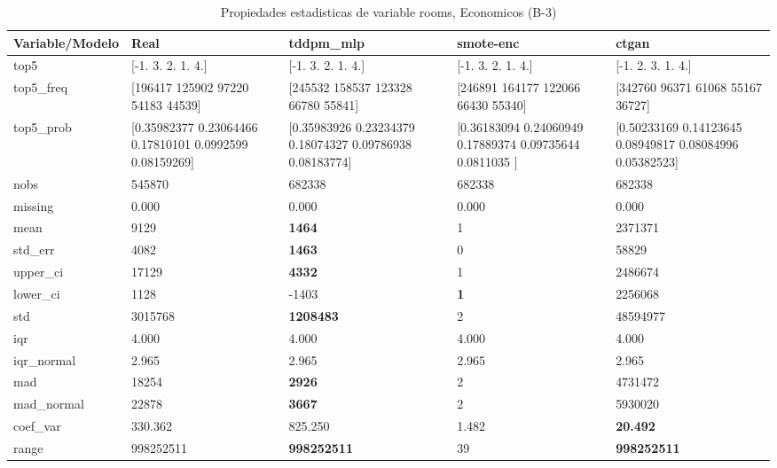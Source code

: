 \begin{table}[H]
\centering
\fontsize{8}{14}\selectfont
\caption{Propiedades  estadisticas de variable rooms, Economicos (B-3)}
\label{table-stats-economicos-b-3-rooms}
\begin{tabular}{|l|m{10em}|m{10em}|m{10em}|m{10em}|}
\hline
 \rowcolor[gray]{0.8}
Variable/Modelo & Real & tddpm\_mlp & smote-enc & ctgan \\
\hline top5 & [-1.  3.  2.  1.  4.] & [-1.  3.  2.  1.  4.] & [-1.  3.  2.  1.  4.] & [-1.  2.  3.  1.  4.] \\
\hline top5\_freq & [196417 125902  97220  54183  44539] & [245532 158537 123328  66780  55841] & [246891 164177 122066  66430  55340] & [342760  96371  61068  55167  36727] \\
\hline top5\_prob & [0.35982377 0.23064466 0.17810101 0.0992599  0.08159269] & [0.35983926 0.23234379 0.18074327 0.09786938 0.08183774] & [0.36183094 0.24060949 0.17889374 0.09735644 0.0811035 ] & [0.50233169 0.14123645 0.08949817 0.08084996 0.05382523] \\
\hline nobs & 545870 & 682338 & 682338 & 682338 \\
\hline missing & 0.000 & 0.000 & 0.000 & 0.000 \\
\hline mean & 9129 & \bfseries 1464 & 1 & \cellcolor[rgb]{0.9, 0.54, 0.52} 2371371 \\
\hline std\_err & 4082 & \bfseries 1463 & 0 & \cellcolor[rgb]{0.9, 0.54, 0.52} 58829 \\
\hline upper\_ci & 17129 & \bfseries 4332 & 1 & \cellcolor[rgb]{0.9, 0.54, 0.52} 2486674 \\
\hline lower\_ci & 1128 & -1403 & \bfseries 1 & \cellcolor[rgb]{0.9, 0.54, 0.52} 2256068 \\
\hline std & 3015768 & \bfseries 1208483 & 2 & \cellcolor[rgb]{0.9, 0.54, 0.52} 48594977 \\
\hline iqr & 4.000 & 4.000 & 4.000 & 4.000 \\
\hline iqr\_normal & 2.965 & 2.965 & 2.965 & 2.965 \\
\hline mad & 18254 & \bfseries 2926 & 2 & \cellcolor[rgb]{0.9, 0.54, 0.52} 4731472 \\
\hline mad\_normal & 22878 & \bfseries 3667 & 2 & \cellcolor[rgb]{0.9, 0.54, 0.52} 5930020 \\
\hline coef\_var & 330.362 & \cellcolor[rgb]{0.9, 0.54, 0.52} 825.250 & 1.482 & \bfseries 20.492 \\
\hline range & 998252511 & \bfseries 998252511 & \cellcolor[rgb]{0.9, 0.54, 0.52} 39 & \bfseries 998252511 \\

\end{tabular}
\end{table}
